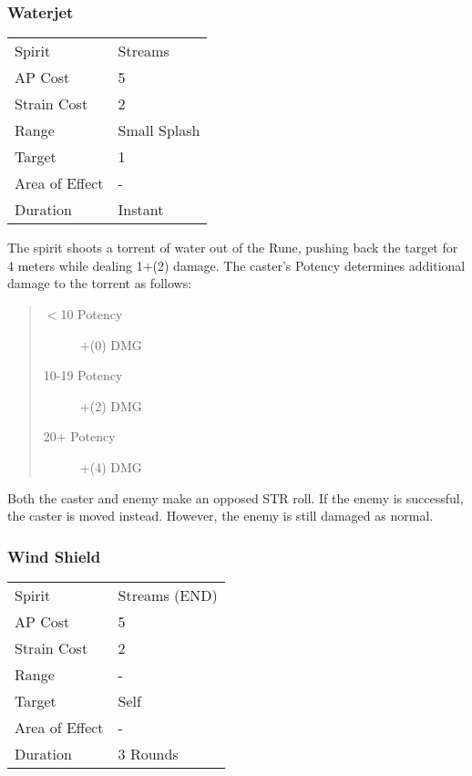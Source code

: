 \documentclass[11pt,a4paper,twocolumn]{book}
\begin{document}
\subsubsection*{Waterjet}
{
	\begin{tabu} to 70mm{| X[l,4] | X[l,7] |}
		\hline
		Spirit         & Streams      \\
		AP Cost        & 5            \\
		Strain Cost    & 2            \\
		Range          & Small Splash \\
		Target         & 1            \\
		Area of Effect & -            \\
		Duration       & Instant      \\ \hline
	\end{tabu}
	
}
\medskip

The spirit shoots a torrent of water out of the Rune, pushing back the target for 4 meters while dealing 1+(2) damage. The caster's Potency determines additional damage to the torrent as follows:

\begin{quote}
	\begin{description}
		\item[$<$10 Potency] 	+(0) DMG
		\item[10-19 Potency] 	+(2) DMG
		\item[20+ Potency] 		+(4) DMG
	\end{description}	
\end{quote}

Both the caster and enemy make an opposed STR roll. If the enemy is successful, the caster is moved instead. However, the enemy is still damaged as normal.

\subsubsection*{Wind Shield}
{
	\begin{tabu} to 70mm{| X[l,4] | X[l,7] |}
		\hline
		Spirit         & Streams (END) \\
		AP Cost        & 5             \\
		Strain Cost    & 2             \\
		Range          & -             \\
		Target         & Self          \\
		Area of Effect & -             \\
		Duration       & 3 Rounds      \\ \hline
	\end{tabu}
	
}
\medskip
\end{document}
